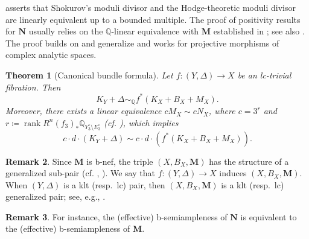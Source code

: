 \documentclass{amsart}
\newcommand{\rank}{\operatorname{rank}}
\newtheorem{theorem}{Theorem}[section]
\theoremstyle{definition}
\newtheorem{remark}[theorem]{Remark}
\theoremstyle{remark}
\def\bQ{\mathbb{Q}}
\newcommand\bfM{{\bf M}}
\def\bfM{\mathbf{M}}
\numberwithin{equation}{section}
\begin{document}
 asserts that 
Shokurov's moduli divisor and the Hodge-theoretic moduli divisor are linearly equivalent up to a bounded multiple. The proof of positivity results for $\mathbf{N}$ usually relies on the $\bQ$-linear equivalence with $\mathbf{M}$ established in ; see also .  The proof builds on and generalize \cite{Amb04, Amb05, Fuj03, FM00, Koll07, Mor87} and works for projective morphisms of complex analytic spaces.

\begin{theorem}[Canonical bundle formula] \label{canonicalbundleformula}
Let $f \colon (Y, \Delta) \to X$ be an lc-trivial fibration.
Then 
\[K_Y+\Delta \sim_{\bQ} f^\ast (K_X + B_X + M_X).\]
Moreover, there exists a linear equivalence $c M_{X} \sim c N_{X}$, where $c = 3^{r}$ and $r \coloneqq \rank R^{n}(f_3)_*\bQ_{Y^{\circ}_{3} \setminus E^{\circ}_{3}}$ (cf. ), which implies 
\[c \cdot d \cdot (K_Y+\Delta) \sim c \cdot d \cdot (f^\ast (K_X + B_X + M_X)).\]
\end{theorem}

\begin{remark} Since $\bfM$ is b-nef, the triple $(X,B_X, \bfM)$ has the structure
of a generalized sub-pair (cf. \cite{BZ16}, \cite{FS20}). We say that $f \colon (Y, \Delta) \to X$ induces $(X,B_X, \bfM)$.  When $(Y,\Delta)$ is a 
klt (resp.\ lc) pair, then 
$(X,B_X, \bfM)$ is a klt (resp.\ lc) generalized pair; see, e.g., \cite{Fil20}.
\end{remark}

\begin{remark}\label{rmk:effectiveb-semiamplenesMN}
    For instance, the (effective) b-semiampleness of $\mathbf{N}$ is equivalent to the (effective) b-semiampleness of $\mathbf{M}$.
\end{remark}
\end{document}
